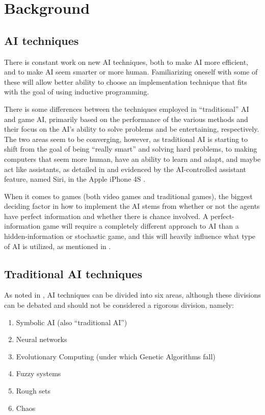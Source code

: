 \cleardoublepage
\chapter{Background}
\label{rel}
\section{AI techniques}
\label{cha:ai-techniques}

There is constant work on new AI techniques, both to make AI more efficient, and
to make AI seem smarter or more human. Familiarizing oneself with some of these
will allow better ability to choose an implementation technique that fits with
the goal of using inductive programming.

There is some differences between the techniques employed in ``traditional'' AI
and game AI, primarily based on the performance of the various methods and their
focus on the AI's ability to solve problems and be entertaining,
respectively. The two areas seem to be converging, however, as traditional AI is
starting to shift from the goal of being ``really smart'' and solving hard
problems, to making computers that seem more human, have an ability to learn and
adapt, and maybe act like assistants, as detailed in \citet[][]{ramos2008guest}
and evidenced by the AI-controlled assistant feature, named Siri, in the
Apple iPhone 4S \citep{apple2011siri}.

When it comes to games (both video games and traditional games), the biggest
deciding factor in how to implement the AI stems from whether or not the agents
have perfect information and whether there is chance involved. A
perfect-information game will require a completely different approach to AI than
a hidden-information or stochastic game, and this will heavily influence what
type of AI is utilized, as mentioned in \citet[pg.~4-5]{schaeffer2002games}.

\section{Traditional AI techniques}
\label{sec:trad-ai-techn}

As noted in \citet[chap.~1]{munakata2008fundamentals}, AI techniques can be
divided into six areas, although these divisions can be debated and should not
be considered a rigorous division, namely:

\begin{enumerate}
\item Symbolic AI (also ``traditional AI'')
\item Neural networks
\item Evolutionary Computing (under which Genetic Algorithms fall)
\item Fuzzy systems
\item Rough sets
\item Chaos
\end{enumerate}

